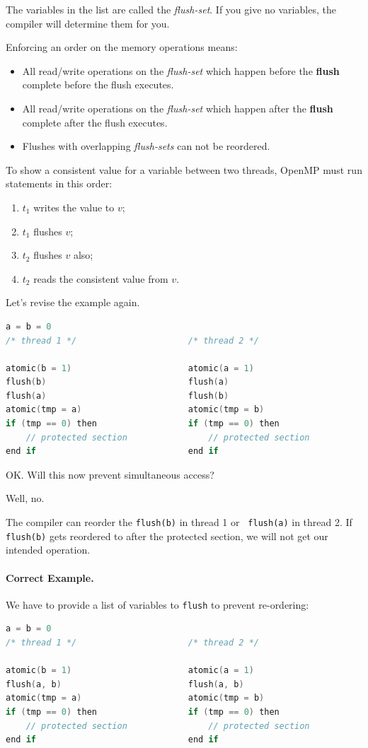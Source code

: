 \documentclass[a4paper]{report}
\begin{document}
The variables in the list are called the {\it flush-set}. 
If you give no variables, the compiler will determine them for you.

Enforcing an order on the memory operations means:
\begin{itemize}
    \item All read/write operations on the {\it flush-set} which happen
      before the {\bf flush} complete before the flush executes.
    \item All read/write operations on the {\it flush-set} which happen
      after the {\bf flush} complete after the flush executes.
    \item Flushes with overlapping {\it flush-sets} can not be reordered.
\end{itemize}

To show a consistent value for a variable between two threads, OpenMP
must run statements in this order:

  \begin{enumerate}
    \item $t_1$ writes the value to $v$;
    \item $t_1$ flushes $v$; 
    \item $t_2$ flushes $v$ also;
    \item $t_2$ reads the consistent value from $v$.
  \end{enumerate}

Let's revise the example again.
  \begin{lstlisting}[language=C]
                    a = b = 0
/* thread 1 */                      /* thread 2 */

atomic(b = 1)                       atomic(a = 1)
flush(b)                            flush(a)
flush(a)                            flush(b)
atomic(tmp = a)                     atomic(tmp = b)
if (tmp == 0) then                  if (tmp == 0) then
    // protected section                // protected section
end if                              end if
  \end{lstlisting}

OK. Will this now prevent simultaneous access?

Well, no.

The compiler can reorder the {\tt flush(b)} in thread 1 or {\tt
  flush(a)} in thread 2. If {\tt flush(b)} gets reordered to after the
protected section, we will not get our intended operation.

\paragraph{Correct Example.} We have to provide a list of variables
to {\tt flush} to prevent re-ordering:
  \begin{lstlisting}[language=C]
                    a = b = 0
/* thread 1 */                      /* thread 2 */

atomic(b = 1)                       atomic(a = 1)
flush(a, b)                         flush(a, b)
atomic(tmp = a)                     atomic(tmp = b)
if (tmp == 0) then                  if (tmp == 0) then
    // protected section                // protected section
end if                              end if
  \end{lstlisting}
\end{document}
